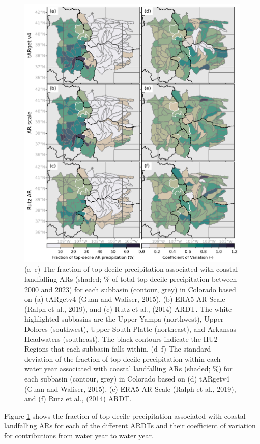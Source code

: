 \documentclass[draft]{agujournal2019}
\begin{document}
\begin{figure}
\noindent\includegraphics[width=\textwidth, height=\textheight, keepaspectratio]{fig7.png}
\caption{(a–c) The fraction of top-decile precipitation associated with coastal landfalling ARs (shaded; \% of total top-decile precipitation between 2000 and 2023) for each subbasin (contour, grey) in Colorado based on (a) tARgetv4 (Guan and Waliser, 2015), (b) ERA5 AR Scale (Ralph et al., 2019), and (c) Rutz et al., (2014) ARDT. The white highlighted subbasins are the Upper Yampa (northwest), Upper Dolores (southwest), Upper South Platte (northeast), and Arkansas Headwaters (southeast). The black contours indicate the HU2 Regions that each subbasin falls within. (d–f) The standard deviation of the fraction of top-decile precipitation within each water year associated with coastal landfalling ARs (shaded; \%) for each subbasin (contour, grey) in Colorado based on (d)  tARgetv4 (Guan and Waliser, 2015), (e) ERA5 AR Scale (Ralph et al., 2019), and (f) Rutz et al., (2014) ARDT. }
\label{fig:choropleth}
\end{figure}


Figure \ref{fig:choropleth} shows the fraction of top-decile precipitation associated with coastal landfalling ARs for each of the different ARDTs and their coefficient of variation for contributions from water year to water year. 
\end{document}
